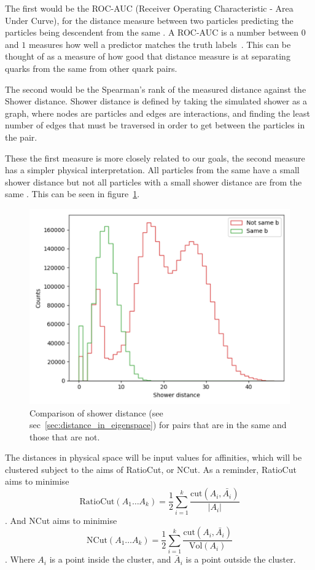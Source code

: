The first would be the ROC-AUC (Receiver Operating Characteristic - Area Under Curve),
for the distance measure between two particles predicting the particles being descendent from the same
.
A ROC-AUC is a number between \(0\) and \(1\) measures how well a predictor matches the truth labels~\cite{Fawcett06anintroduction}.
This can be thought of as a measure of how good that distance measure is at separating 
quarks from the same  from other quark pairs.

The second would be the Spearman's rank of the measured distance against the Shower distance.
Shower distance is defined by taking the simulated shower as a graph, where nodes are particles
and edges are interactions, and finding the least number of edges that must be traversed
in order to get between the particles in the pair.

These the first measure is more closely related to our goals,
the second measure has a simpler physical interpretation.
All particles from the same  have a small shower distance
but not all particles with a small shower distance are from the same .
This can be seen in figure~\ref{fig:shower_distance_example}.

\begin{figure}[htp]
    \includegraphics[width=.5\textwidth]{graphics/shower_distance_example}
    \caption{
        Comparison of shower distance (see sec~\ref{sec:distance_in_eigenspace})
        for pairs that are in the same 
        and those that are not.
             }\label{fig:shower_distance_example}
\end{figure}    

The distances in physical space will be input values for affinities,
which will be clustered subject to the aims of RatioCut, or NCut.
As a reminder, RatioCut aims to minimise
        \begin{equation} \text{RatioCut}(A_1 \dots A_k) = \frac{1}{2} \sum_{i=1}^k \frac{\text{cut}(A_i, \bar{A_i})}{|A_i|}\end{equation}.
And NCut aims to minimise 
        \begin{equation} \text{NCut}(A_1 \dots A_k) = \frac{1}{2} \sum_{i=1}^k \frac{\text{cut}(A_i, \bar{A_i})}{\text{Vol}(A_i)}\end{equation}.
Where \(A_i\) is a point inside the cluster, and \(\bar{A}_i\) is a point outside the cluster.

